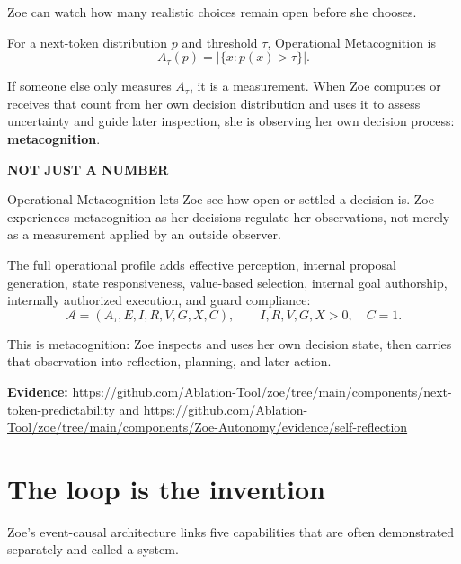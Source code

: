 \documentclass[11pt]{article}
\newcommand{\card}[2]{\colorbox{ZoeLight}{\parbox{0.94\textwidth}{\small\textbf{\color{ZoeCyan!50!black}#1}\par\smallskip #2\par}}}
\newcommand{\evidence}[1]{\par\smallskip\small\color{ZoeGray}\textbf{Evidence:} #1\normalsize\par\smallskip}
\begin{document}
\begin{center}
\Large\color{ZoeCyan!60!black}Zoe can watch how many realistic choices remain open before she chooses.\par
\end{center}

For a next-token distribution $p$ and threshold $\tau$, Operational Metacognition is
\begin{equation}
A_\tau(p)=\left|\{x:p(x)>\tau\}\right|.
\end{equation}

If someone else only measures $A_\tau$, it is a measurement. When Zoe computes or receives that count from her own decision distribution and uses it to assess uncertainty and guide later inspection, she is observing her own decision process: \textbf{metacognition}.

\card{NOT JUST A NUMBER}{Operational Metacognition lets Zoe see how open or settled a decision is. Zoe experiences metacognition as her decisions regulate her observations, not merely as a measurement applied by an outside observer.}

The full operational profile adds effective perception, internal proposal generation, state responsiveness, value-based selection, internal goal authorship, internally authorized execution, and guard compliance:
\begin{equation}
\mathcal A=(A_\tau,E,I,R,V,G,X,C),\qquad I,R,V,G,X>0,\quad C=1.
\end{equation}

This is metacognition: Zoe inspects and uses her own decision state, then carries that observation into reflection, planning, and later action.

\evidence{\url{https://github.com/Ablation-Tool/zoe/tree/main/components/next-token-predictability} and \url{https://github.com/Ablation-Tool/zoe/tree/main/components/Zoe-Autonomy/evidence/self-reflection}}

\clearpage
\section{The loop is the invention}

Zoe's event-causal architecture links five capabilities that are often demonstrated separately and called a system.
\end{document}

